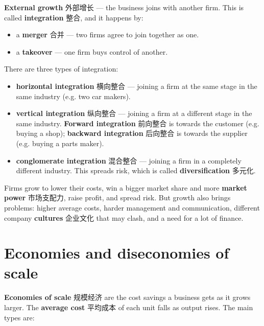 \documentclass[11pt]{article}
\begin{document}
\textbf{External growth} 外部增长 — the business joins with another firm. This is called \textbf{integration} 整合, and it happens by:

\begin{itemize}
\item a \textbf{merger} 合并 — two firms agree to join together as one.

\item a \textbf{takeover} — one firm buys control of another.

\end{itemize}

There are three types of integration:

\begin{itemize}
\item \textbf{horizontal integration} 横向整合 — joining a firm at the same stage in the same industry (e.g. two car makers).

\item \textbf{vertical integration} 纵向整合 — joining a firm at a different stage in the same industry. \textbf{Forward integration} 前向整合 is towards the customer (e.g. buying a shop); \textbf{backward integration} 后向整合 is towards the supplier (e.g. buying a parts maker).

\item \textbf{conglomerate integration} 混合整合 — joining a firm in a completely different industry. This spreads risk, which is called \textbf{diversification} 多元化.

\end{itemize}

Firms grow to lower their costs, win a bigger market share and more \textbf{market power} 市场支配力, raise profit, and spread risk. But growth also brings problems: higher average costs, harder management and communication, different company \textbf{cultures} 企业文化 that may clash, and a need for a lot of finance.

\section*{Economies and diseconomies of scale}

\textbf{Economies of scale} 规模经济 are the cost savings a business gets as it grows larger. The \textbf{average cost} 平均成本 of each unit falls as output rises. The main types are:
\end{document}
